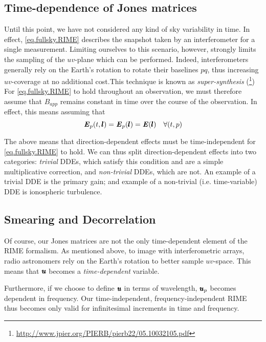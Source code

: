 \subsection{Time-dependence of Jones matrices}
\label{section.RIME.TimeDep.Jones}

\pg
Until this point, we have not considered any kind of sky variability in time. In effect, \cref{eq.fullsky.RIME} describes the snapshot taken by an interferometer for a single measurement. Limiting ourselves to this scenario, however, strongly limits the sampling of the $uv$-plane which can be performed. Indeed, interferometers generally rely on the Earth's rotation to rotate their baselines $pq$, thus increasing $uv$-coverage at no additional cost.This technique is known as \emph{super-synthesis} (\cite{supersynthesis}\footnote{\href{http://www.jpier.org/PIERB/pierb22/05.10032105.pdf}{\url{http://www.jpier.org/PIERB/pierb22/05.10032105.pdf}}}) For \cref{eq.fullsky.RIME} to hold throughout an observation, we must therefore assume that $B_{app}$ remains constant in time over the course of the observation. In effect, this means assuming that
\begin{equation}\label{eq.selfcal.requirement}
\textbf{\emph{E}}_p(t,\pmb{l}) = \textbf{\emph{E}}_p(\pmb{l}) = \textbf{\emph{E}}(\pmb{l}) \quad \forall (t,p)
\end{equation}

\pg
The above means that direction-dependent effects must be time-independent for \cref{eq.fullsky.RIME} to hold. We can thus split direction-dependent effects into two categories: \emph{trivial} DDEs, which satisfy this condition and are a simple multiplicative correction, and \emph{non-trivial} DDEs, which are not. An example of a trivial DDE is the primary gain; and example of a non-trivial (i.e. time-variable) DDE is ionospheric turbulence.

\subsection{Smearing and Decorrelation}
\label{section.RIME.TimeDep.Decoherence}

\pg
Of course, our Jones matrices are not the only time-dependent element of the RIME formalism. As mentioned above, to image with interferometric arrays, radio astronomers rely on the Earth's rotation to better sample $uv$-space. This means that $\pmb{u}$ becomes a \emph{time-dependent} variable.

\pg
Furthermore, if we choose to define $\pmb{u}$ in terms of wavelength, $\pmb{u}_p$ becomes dependent in frequency. Our time-independent, frequency-independent RIME thus becomes only valid for infinitesimal increments in time and frequency.


